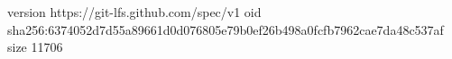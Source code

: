 version https://git-lfs.github.com/spec/v1
oid sha256:6374052d7d55a89661d0d076805e79b0ef26b498a0fcfb7962cae7da48c537af
size 11706

